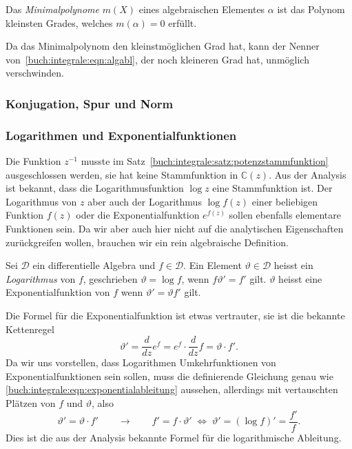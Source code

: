 \begin{definition}
Das {\em Minimalpolynome} $m(X)$ eines algebraischen Elementes $\alpha$ ist
das Polynom kleinsten Grades, welches $m(\alpha)=0$ erfüllt.
\end{definition}

Da das Minimalpolynom den kleinstmöglichen Grad hat, kann der Nenner
von~\eqref{buch:integrale:eqn:algabl},
der noch kleineren Grad hat, unmöglich verschwinden.

\subsubsection{Konjugation, Spur und Norm}

\subsubsection{Logarithmen und Exponentialfunktionen}
Die Funktion $z^{-1}$ musste im
Satz~\ref{buch:integrale:satz:potenzstammfunktion}
ausgeschlossen werden, sie hat keine Stammfunktion in $\mathbb{C}(z)$.
Aus der Analysis ist bekannt, dass die Logarithmusfunktion $\log z$ 
eine Stammfunktion ist.
Der Logarithmus von $z$ aber auch der Logarithmus $\log f(z)$
einer beliebigen Funktion $f(z)$ oder die Exponentialfunktion $e^{f(z)}$
sollen ebenfalls elementare Funktionen sein.
Da wir aber auch hier nicht auf die analytischen Eigenschaften zurückgreifen
wollen, brauchen wir ein rein algebraische Definition.

\begin{definition}
\label{buch:integrale:def:logexp}
Sei $\mathscr{D}$ ein differentielle Algebra und $f\in\mathscr{D}$.
Ein Element $\vartheta\in\mathscr{D}$ heisst ein {\em Logarithmus}
von $f$, geschrieben $\vartheta = \log f$, wenn $f\vartheta' = f'$ gilt.
$\vartheta$ heisst eine Exponentialfunktion von $f$ wenn
$\vartheta'=\vartheta f'$ gilt.
\end{definition}

Die Formel für die Exponentialfunktion ist etwas vertrauter, sie ist
die bekannte Kettenregel
\begin{equation}
\vartheta'
=
\frac{d}{dz} e^f
=
e^f \cdot \frac{d}{dz} f
=
\vartheta \cdot f'.
\label{buch:integrale:eqn:exponentialableitung}
\end{equation}
Da wir uns vorstellen, dass Logarithmen Umkehrfunktionen von 
Exponentialfunktionen sein sollen, 
muss die definierende Gleichung genau wie
\eqref{buch:integrale:eqn:exponentialableitung}
aussehen, allerdings mit vertauschten Plätzen von $f$ und $\vartheta$,
also 
\begin{equation}
\vartheta' = \vartheta\cdot f'
\qquad
\rightarrow
\qquad
f' = f\cdot \vartheta'
\;\Leftrightarrow\;
\vartheta' = (\log f)' = \frac{f'}{f}.
\label{buch:integrale:eqn:logarithmischeableitung}
\end{equation}
Dies ist die aus der Analysis bekannte Formel für die logarithmische
Ableitung.

